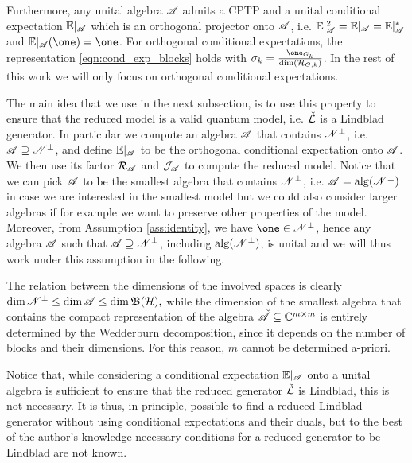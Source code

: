 \documentclass[aihp,12pt]{imsart}
\begin{document}
Furthermore, any unital algebra $\mathscr{A}$ admits a CPTP and a unital conditional expectation $\mathbb{E}|_{\mathscr{A}}$ which is an orthogonal projector onto $\mathscr{A}$, i.e. $\mathbb{E}|_{\mathscr{A}}^2 = \mathbb{E}|_{\mathscr{A}} = \mathbb{E}|_{\mathscr{A}}^*$ and $\CE_\As(\one) = \one$. For orthogonal conditional expectations, the representation \eqref{eqn:cond_exp_blocks} holds with $\sigma_k = \frac{\one_{G_k}}{\dim(\Hc_{G,k})}$. In the rest of this work we will only focus on orthogonal conditional expectations.

The main idea that we use in the next subsection, is to use this property to ensure that the reduced model is a valid quantum model, i.e. $\check{\mathcal{L}}$ is a Lindblad generator. In particular we compute an algebra $\mathscr{A}$ that contains $\mathscr{N}^\perp$, i.e. $\mathscr{A}\supseteq\mathscr{N}^\perp$, and define $\mathbb{E}|_{\mathscr{A}}$ to be the orthogonal conditional expectation onto $\mathscr{A}$. We then use its factor $\mathcal{R}_{\mathscr{A}}$ and $\mathcal{J}_{\mathscr{A}}$ to compute the reduced model. Notice that we can pick $\mathscr{A}$ to be the smallest algebra that contains $\mathscr{N}^\perp$, i.e. $\mathscr{A}={\rm alg}(\mathscr{N}^\perp)$ in case we are interested in the smallest model but we could also consider larger algebras if for example we want to preserve other properties of the model. 
Moreover, from Assumption \ref{ass:identity}, we have $\one\in\Ns^\perp$, hence any algebra $\mathscr{A}$ such that $\mathscr{A}\supseteq \mathscr{N}^\perp$, including ${\rm alg}(\mathscr{N}^\perp)$, is unital and we will thus work under this assumption in the following.

The relation between the dimensions of the involved spaces is clearly $\dim\mathscr{N}^\perp\leq\dim\mathscr{A}\leq\dim\mathfrak{B}(\mathcal{H}),$ while the dimension of the smallest algebra that contains the compact representation of the algebra $\check{\mathscr{A}}\subseteq \mathbb{C}^{m\times m}$ is entirely determined by the Wedderburn decomposition, since it depends on the number of blocks and their dimensions. For this reason, $m$ cannot be determined a-priori.

Notice that, while considering a conditional expectation $\mathbb{E}|_{\mathscr{A}}$ onto a unital algebra is sufficient to ensure that the reduced generator $\check{\mathcal{L}}$ is Lindblad, this is not necessary. It is thus, in principle, possible to find a reduced Lindblad generator without using conditional expectations and their duals, but to the best of the author's knowledge necessary conditions for a reduced generator to be Lindblad are not known. 
\end{document}
